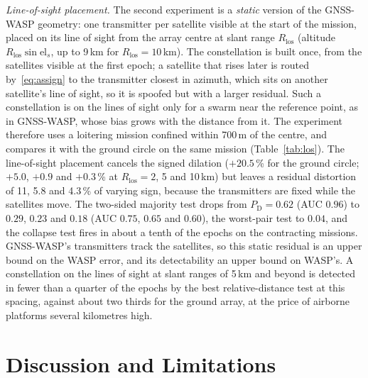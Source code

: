 \documentclass[conference]{IEEEtran}
\newcommand{\PD}{P_{\mathrm{D}}}
\begin{document}
\emph{Line-of-sight placement.} The second experiment is a
\emph{static} version of the GNSS-WASP geometry: one transmitter per
satellite visible at the start of the mission, placed on its line of
sight from the array centre at slant range $R_{\mathrm{los}}$ (altitude
$R_{\mathrm{los}}\sin\mathrm{el}_s$, up to 9\,km for
$R_{\mathrm{los}}=10$\,km). The constellation is built once, from the
satellites visible at the first epoch; a satellite that rises later is
routed by~\eqref{eq:assign} to the transmitter closest in azimuth, which
sits on another satellite's line of sight, so it is spoofed but with a
larger residual. Such a constellation is on the lines of sight
only for a swarm near the reference point, as in GNSS-WASP, whose bias
grows with the distance from it. The experiment therefore uses a
loitering mission confined within 700\,m of the centre, and compares it
with the ground circle on the same mission (Table~\ref{tab:los}). The
line-of-sight placement cancels the signed dilation ($+20.5$\,\% for the
ground circle; $+5.0$, $+0.9$ and $+0.3$\,\% at $R_{\mathrm{los}}=2$, 5
and 10\,km) but leaves a residual distortion of 11, 5.8 and 4.3\,\% of
varying sign, because the transmitters are fixed while the satellites
move. The two-sided majority test drops from $\PD=0.62$ (AUC $0.96$) to
$0.29$, $0.23$ and $0.18$ (AUC $0.75$, $0.65$ and $0.60$), the
worst-pair test to $0.04$, and the collapse test fires in about a tenth
of the epochs on the contracting missions. GNSS-WASP's transmitters
track the satellites, so this static residual is an upper bound on the
WASP error, and its detectability an upper bound on WASP's. A
constellation on the lines of sight at slant ranges of 5\,km and beyond
is detected in fewer than a quarter of the epochs by the best
relative-distance test at this spacing, against about two thirds for the
ground array, at the price of airborne platforms several kilometres high.

\section{Discussion and Limitations}
\label{sec:discussion}
\end{document}
